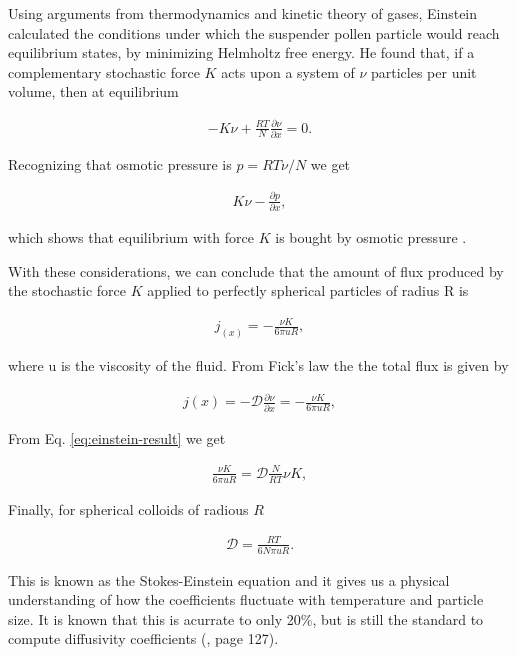 Using arguments from thermodynamics and kinetic theory of gases, Einstein calculated the conditions under which the suspender pollen particle would reach equilibrium states, by minimizing Helmholtz free energy. He found that, if a complementary stochastic force $K$ acts upon a system of $\nu$ particles per unit volume, then at equilibrium

\begin{align}
	-K\nu +\frac{RT}{N}\frac{\partial \nu}{\partial x} = 0.
\end{align} 

Recognizing that osmotic pressure is $p = RT \nu /N$ we get

\begin{align}
\label{eq:einstein-result}
	K\nu - \frac{\partial p}{\partial x},
\end{align}

which shows that equilibrium with force $K$ is bought by osmotic pressure \cite{einstein}. 

With these considerations, we can conclude that the amount of flux produced by the stochastic force $K$ applied to perfectly spherical particles of radius R is

\begin{align}
	j_(x) = -\frac{\nu K}{6\pi u R},
\end{align}

where u is the viscosity of the fluid. From Fick's law the the total flux is given by

\begin{align}
	j(x) = -\mathcal{D}\frac{\partial \nu}{\partial x} = - \frac{\nu K}{6\pi u R},
\end{align}

From Eq. \ref{eq:einstein-result} we get

\begin{align}
\frac{\nu K}{6\pi u R} = \mathcal{D}\frac{N}{RT}\nu K,
\end{align}

Finally, for spherical colloids of radious $R$

\begin{align}
	\mathcal{D} = \frac{RT}{6N\pi u R}.
\end{align}


This is known as the Stokes-Einstein equation and it gives us a physical understanding of how the coefficients fluctuate with temperature and particle size. It is known that this is acurrate to only 20\%, but is still the standard to compute diffusivity coefficients (\cite{cussler}, page 127).









